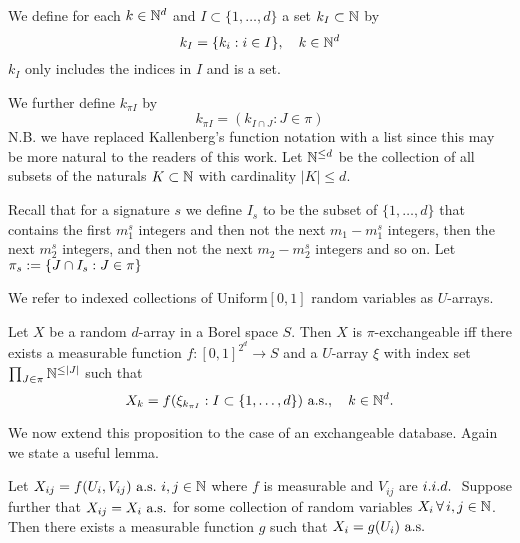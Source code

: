 We define for each $k \in \mathbb{N}^d$ and $I \subset \{1,\ldots,d\}$ a set $k_I \subset \mathbb{N}$ by
\begin{equation}
k_I = \{k_i: i \in I\}, \quad k \in \mathbb{N}^d
\end{equation}
\ie $k_I$ only includes the indices in $I$ and is a set.

We further define $k_{\pi I}$ by
\begin{equation}
  k_{\pi I} = (k_{I \cap J} : J \in \pi)
\end{equation}
N.B. we have replaced Kallenberg's function notation with a list since this may be more natural to the readers of this work.
Let $\mathbb{N}^{\leq d}$ be the collection of all subsets of the naturals $K \subset \mathbb{N}$ with cardinality $|K| \leq d$.

Recall that for a signature $s$ we define $I_s$ to be the subset of $\{1,\ldots,d\}$ that contains the first $m_1^s$ integers and then not the next $m_1 - m_1^s$ integers, then the next $m_2^s$ integers, and then not the next $m_2 - m_2^s$ integers and so on.
Let $\pi_s := \{J \cap I_s : J \in \pi\}$

We refer to indexed collections of \iid Uniform$[0,1]$ random variables as $U$-arrays.

\begin{prop}
\label{prop:piexas}
  Let $X$ be a random $d$-array in a Borel space $S$.
  Then $X$ is $\pi$-exchangeable iff there exists a measurable function $f:[0,1]^{2^d}\to S$ and a $U$-array $\xi$ with index set $\prod_{J\in\pi} \mathbb{N}^{\leq |J|}$ such that
  \begin{equation}
    X_k = f(\xi_{k_{\pi I}} : I \subset \{1,\ldots,d\}) \ \textrm{a.s.}, \quad k \in \mathbb{N}^d.
    \label{eq:piexas}
  \end{equation}
\end{prop}

We now extend this proposition to the case of an exchangeable database.
Again we state a useful lemma.

\begin{lemma}
  \label{lemma:copies-full-simple}
  Let $X_{ij} = f({U}_i, {V}_{ij}) \ \textrm{a.s.} \ i,j \in \mathbb{N}$ where $f$ is measurable and ${V}_{ij}$ are $i.i.d.\ $
  Suppose further that $X_{ij} = X_i \ \textrm{a.s.}$ for some collection of random variables $X_{i} \, \forall \, i,j \in \mathbb{N}$.
  Then there exists a measurable function $g$ such that $X_i = g({U}_i) \ \textrm{a.s.}$
\end{lemma}

